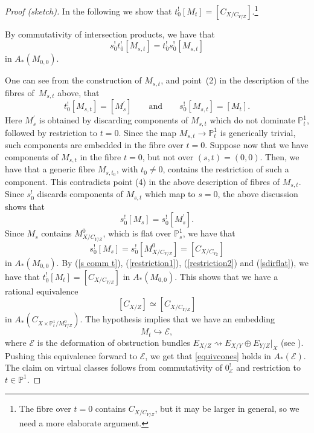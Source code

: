 \documentclass[pdftex]{sigma}
\numberwithin{equation}{section}
\newcommand{\PP}{\mathbb P}
\begin{document}
\begin{proof}[Proof (sketch)]
In the following we show that $t_0^![M_t]=[C_{X/C_{Y/Z}}]$.\footnote{The fibre over $t=0$ contains $C_{X/C_{Y/Z}}$, but it may be larger in general, so we need a more elaborate argument.}

By commutativity of intersection products, we have that
\begin{equation}\label{s comm t} s_0^!t^!_0[M_{s,t}] =t_0^!s^!_0[M_{s,t}]
\end{equation}
in $A_*(M_{0,0})$.

One can see from the construction of $M_{s,t}$, and point~(2) in the description of the fibres of~$M_{s,t}$ above, that
\begin{equation}\label{restriction1}t^!_0[M_{s,t}]=[M^{\prime}_s] \qquad \text{and} \qquad s^!_0[M_{s,t}]=[M_t].
\end{equation}
Here $M^{\prime}_s$ is obtained by discarding components of $M_{s,t}$ which do not dominate $\PP^1_t$, followed by restriction to $t=0$. Since the map $M_{s,t}\to\PP^1_t$ is generically trivial, such components are embedded in the fibre over $t=0$. Suppose now that we have components of $M_{s,t}$ in the fibre $t=0$, but not over $(s,t)=(0,0)$. Then, we have that a generic fibre $M_{s,t_0}$, with $t_0\neq 0$, contains the restriction of such a component. This contradicts point (4) in the above description of fibres of $M_{s,t}$. Since $s_0^!$ discards components of $M_{s,t}$ which map to $s=0$, the above discussion shows that
\begin{equation}\label{restriction2}s^!_0[M_s]=s^!_0[M^{\prime}_s].
\end{equation}
Since $M_s$ contains $M^0_{X/C_{Y/Z}}$, which is flat over $\PP^1_s$, we have that
\begin{equation}\label{sdirflat}s^!_0[M_s] =s^!_0[M^0_{X/C_{Y/Z}}]=[C_{X/C_{Y_Z}}]
\end{equation}
in $A_*(M_{0,0})$.
\noindent By (\ref{s comm t}), (\ref{restriction1}), (\ref{restriction2}) and (\ref{sdirflat}), we have that $t_0^![M_t]=[C_{X/C_{Y/Z}}]$ in $A_*(M_{0,0})$. This shows that we have a rational equivalence
\begin{equation}\label{equivcones}[C_{X/Z}]\simeq [C_{X/C_{Y/Z}}]
\end{equation}
in $A_*(C_{X\times\PP^1_t/M^0_{Y/Z}})$.
The hypothesis implies that we have an embedding
\[
M_t\hookrightarrow \mathcal{E},
\]
where $\mathcal{E}$ is the deformation of obstruction bundles $E_{X/Z}\rightsquigarrow E_{X/Y}\oplus E_{Y/Z}\rvert _X$ (see \cite{KKP}).
Pushing this equivalence forward to $\mathcal{E}$, we get that \eqref{equivcones} holds in $A_*(\mathcal{E})$. The claim on virtual classes follows from commutativity of $0^!_{\mathcal E}$ and restriction to $t\in\PP^1$.
\end{proof}
\end{document}
